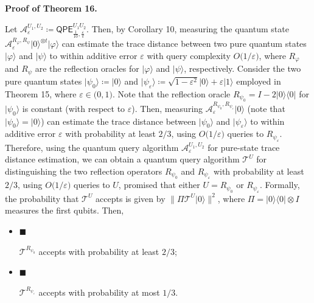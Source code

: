 \documentclass[10pt,a4paper]{article}
\begin{document}
\par\medskip\noindent\textbf{Proof of Theorem 16.}\par




Let $\mathcal{A}^{U_{1},U_{2}}_{\varepsilon}\coloneqq\mathsf{QPE}_{\frac{1}{10},\frac{\varepsilon}{\pi}}^{U_{1}U_{2}}$.
Then, by Corollary 10, measuring the quantum state $\mathcal{A}^{R_{\varphi},R_{\psi}}_{\varepsilon}\lvert 0\rangle^{\otimes t}\lvert\varphi\rangle$ can estimate the trace distance between two pure quantum states $\lvert\varphi\rangle$ and $\lvert\psi\rangle$ to within additive error $\varepsilon$ with query complexity $O\lparen 1/\varepsilon\rparen$, where $R_{\varphi}$ and $R_{\psi}$ are the reflection oracles for $\lvert\varphi\rangle$ and $\lvert\psi\rangle$, respectively.
Consider the two pure quantum states $\lvert\psi_{0}\rangle\coloneqq\lvert 0\rangle$ and $\lvert\psi_{\varepsilon}\rangle\coloneqq\sqrt{1-\varepsilon^{2}}\lvert 0\rangle+\varepsilon\lvert 1\rangle$ employed in Theorem 15, where $\varepsilon\in\lparen 0,1\rparen$.
Note that the reflection oracle $R_{\psi_{0}}=I-2\lvert 0\rangle\!\langle 0\rvert$ for $\lvert\psi_{0}\rangle$ is constant (with respect to $\varepsilon$).
Then, measuring $\mathcal{A}^{R_{\psi_{0}},R_{\psi_{\varepsilon}}}_{\varepsilon}\lvert 0\rangle$ (note that $\lvert\psi_{0}\rangle=\lvert 0\rangle$) can estimate the trace distance between $\lvert\psi_{0}\rangle$ and $\lvert\psi_{\varepsilon}\rangle$ to within additive error $\varepsilon$ with probability at least $2/3$, using $O\lparen 1/\varepsilon\rparen$ queries to $R_{\psi_{\varepsilon}}$.
Therefore, using the quantum query algorithm $\mathcal{A}^{U_{1},U_{2}}_{\varepsilon}$ for pure-state trace distance estimation, we can obtain a quantum query algorithm $\mathcal{T}^{U}$ for distinguishing the two reflection operators $R_{\psi_{0}}$ and $R_{\psi_{\varepsilon}}$ with probability at least $2/3$, using $O\lparen 1/\varepsilon\rparen$ queries to $U$, promised that either $U=R_{\psi_{0}}$ or $R_{\psi_{\varepsilon}}$.
Formally, the probability that $\mathcal{T}^{U}$ accepts is given by $\lVert\Pi\mathcal{T}^{U}\lvert 0\rangle\rVert^{2}$, where $\Pi=\lvert 0\rangle\!\langle 0\rvert\otimes I$ measures the first qubits.
Then,\par


\begin{itemize}


\item[] 
$\blacksquare$ 


$\mathcal{T}^{R_{\psi_{0}}}$ accepts with probability at least $2/3$;\par





\item[] 
$\blacksquare$ 


$\mathcal{T}^{R_{\psi_{\varepsilon}}}$ accepts with probability at most $1/3$.\par





\end{itemize}
\end{document}
